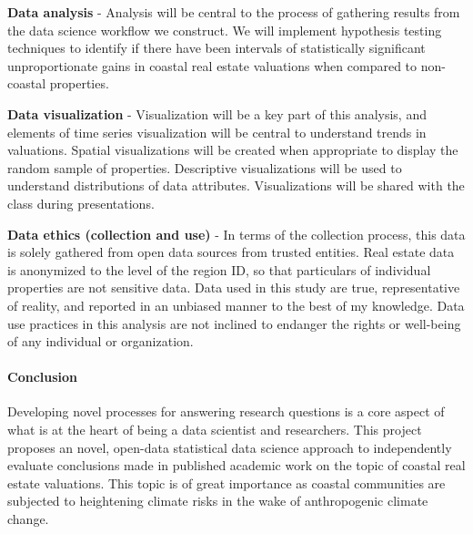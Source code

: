 \documentclass[12pt]{article}
\begin{document}
\textbf{Data analysis} - Analysis will be central to the process of gathering results from the data science workflow we construct. We will implement hypothesis testing techniques to identify if there have been intervals of statistically significant unproportionate gains in coastal real estate valuations when compared to non-coastal properties. 

\textbf{Data visualization} - Visualization will be a key part of this analysis, and elements of time series visualization will be central to understand trends in valuations. Spatial visualizations will be created when appropriate to display the random sample of properties. Descriptive visualizations will be used to understand distributions of data attributes. Visualizations will be shared with the class during presentations. 

\textbf{Data ethics (collection and use)} - In terms of the collection process, this data is solely gathered from open data sources from trusted entities. Real estate data is anonymized to the level of the region ID, so that particulars of individual properties are not sensitive data. Data used in this study are true, representative of reality, and reported in an unbiased manner to the best of my knowledge. Data use practices in this analysis are not inclined to endanger the rights or well-being of any individual or organization. 

\paragraph{Conclusion}

Developing novel processes for answering research questions is a core aspect of what is at the heart of being a data scientist and researchers. This project proposes an novel, open-data statistical data science approach to independently evaluate conclusions made in published academic work on the topic of coastal real estate valuations. This topic is of great importance as coastal communities are subjected to heightening climate risks in the wake of anthropogenic climate change.




\end{document}

